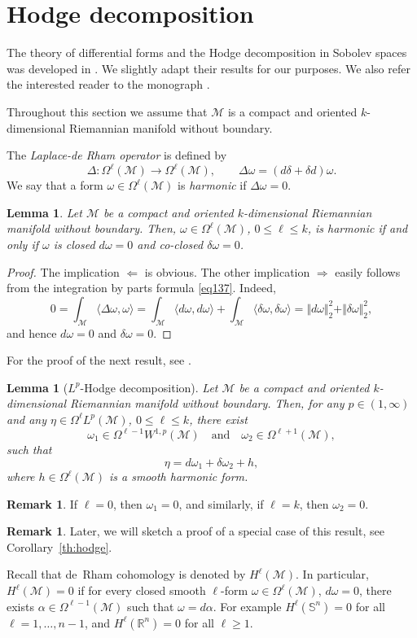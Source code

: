 \documentclass[intlimits,12pt,reqno]{amsart}
\newcommand{\cM}{\mathcal M}
\newcommand{\R}{\mathbb R}
\numberwithin{equation}{section}
\newtheorem{lemma}[theorem]{Lemma}
\theoremstyle{definition}
\newtheorem{remark}[theorem]{Remark}
\begin{document}
\section{Hodge decomposition}
\label{S:Hodge}
The theory of differential forms and the Hodge decomposition in Sobolev spaces was developed in \cite{ISS99}. We slightly adapt their results for our purposes. We also refer the interested reader to the monograph \cite{CDK}.

Throughout this section we assume that $\cM$ is a compact and oriented $k$-dimensional Riemannian manifold without boundary.

The {\em Laplace-de Rham operator} is defined by
$$
\Delta:\Omega^\ell(\cM)\to\Omega^\ell(\cM),
\qquad
\Delta\omega=(d\delta+\delta d)\omega.
$$
We say that a form $\omega\in\Omega^\ell(\cM)$ is {\em harmonic} if $\Delta\omega=0$.
\begin{lemma}
\label{T103}
Let $\cM$ be a compact and oriented $k$-dimensional Riemannian manifold without boundary. Then, $\omega\in\Omega^\ell(\cM)$, $0\leq\ell\leq k$, is harmonic if and only if $\omega$ is closed $d\omega=0$ and co-closed $\delta\omega=0$.
\end{lemma}
\begin{proof}
The implication $\Leftarrow$ is obvious. The other implication $\Rightarrow$ easily follows from the integration by parts formula \eqref{eq137}. Indeed,
$$
0=\int_\cM\langle\Delta\omega,\omega\rangle=\int_\cM\langle d\omega,d\omega\rangle
+ \int_\cM\langle \delta\omega,\delta\omega\rangle=\Vert d\omega\Vert_2^2+\Vert\delta\omega\Vert_2^2,
$$
and hence $d\omega=0$ and $\delta\omega=0$.
\end{proof}
For the proof of the next result, see \cite[Proposition~6.5]{scott}.
\begin{lemma}[$L^p$-Hodge decomposition]
\label{T104}
Let $\cM$ be a compact and oriented $k$-dimensional Riemannian manifold without boundary. Then, for any $p\in (1,\infty)$ and any $\eta\in\Omega^\ell L^p(\cM)$, $0\leq\ell\leq k$, there exist
$$
\omega_1\in \Omega^{\ell-1}W^{1,p}(\cM) 
\quad
\text{and}
\quad
\omega_2\in\Omega^{\ell+1}(\cM),
$$
such that
$$
\eta=d\omega_1+\delta\omega_2+h,
$$
where $h\in\Omega^\ell(\cM)$ is a smooth harmonic form.
\end{lemma}
\begin{remark}
If $\ell=0$, then $\omega_1=0$, and similarly, if $\ell=k$, then $\omega_2=0$.
\end{remark}
\begin{remark}
Later, we will sketch a proof of a special case of this result, see Corollary~\ref{th:hodge}.
\end{remark}
Recall that de~Rham cohomology is denoted by $H^\ell(\cM)$. 
In particular, $H^\ell(\cM)=0$ if for every closed smooth $\ell$-form $\omega \in\Omega^\ell(\cM)$, $d\omega = 0$, there exists $\alpha \in \Omega^{\ell-1}(\cM)$ such that $\omega = d\alpha$.
For example $H^\ell(\mathbb{S}^n) = 0$ for all $\ell = 1,\ldots,n-1$, and $H^\ell(\R^n)=0$ for all $\ell\geq 1$.
\end{document}
